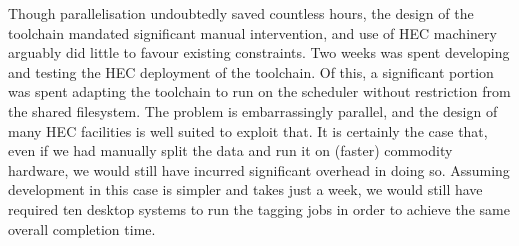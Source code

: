 
Though parallelisation undoubtedly saved countless hours, the design of the toolchain mandated significant manual intervention, and use of HEC machinery arguably did little to favour existing constraints.
Two weeks was spent developing and testing the HEC deployment of the toolchain.  Of this, a significant portion was spent adapting the toolchain to run on the scheduler without restriction from the shared filesystem.
The problem is embarrassingly parallel, and the design of many HEC facilities is well suited to exploit that.  It is certainly the case that, even if we had manually split the data and run it on (faster) commodity hardware, we would still have incurred significant overhead in doing so.  Assuming development in this case is simpler and takes just a week, we would still have required ten desktop systems to run the tagging jobs in order to achieve the same overall completion time.  

